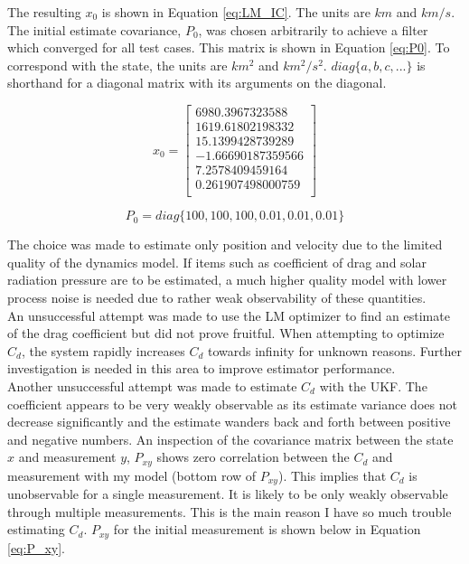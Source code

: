 \documentclass[11pt]{article}
\begin{document}
The resulting $x_0$ is shown in Equation \eqref{eq:LM_IC}. The units are $km$ and $km/s$. The initial estimate covariance, $P_0$, was chosen arbitrarily to achieve a filter which converged for all test cases. This matrix is shown in Equation \eqref{eq:P0}. To correspond with the state, the units are $km^2$ and $km^2/s^2$. $diag \{a, b, c, ... \}$ is shorthand for a diagonal matrix with its arguments on the diagonal.

\begin{equation}
	\label{eq:LM_IC}
	x_0 = \begin{bmatrix}
	6980.3967323588 \\
	1619.61802198332 \\
	15.1399428739289 \\
	-1.66690187359566 \\
	7.2578409459164 \\
	0.261907498000759 \\	
	\end{bmatrix}
\end{equation}

\begin{equation}
	\label{eq:P0}
	P_0 = diag \{ 100, 100, 100, 0.01, 0.01, 0.01 \}
\end{equation}

The choice was made to estimate only position and velocity due to the limited quality of the dynamics model. If items such as coefficient of drag and solar radiation pressure are to be estimated, a much higher quality model with lower process noise is needed due to rather weak observability of these quantities. \\

An unsuccessful attempt was made to use the LM optimizer to find an estimate of the drag coefficient but did not prove fruitful. When attempting to optimize $C_d$, the system rapidly increases $C_d$ towards infinity for unknown reasons. Further investigation is needed in this area to improve estimator performance. \\

Another unsuccessful attempt was made to estimate $C_d$ with the UKF. The coefficient appears to be very weakly observable as its estimate variance does not decrease significantly and the estimate wanders back and forth between positive and negative numbers. An inspection of the covariance matrix between the state $x$ and measurement $y$, $P_{xy}$ shows zero correlation between the $C_d$ and measurement with my model (bottom row of $P_{xy}$). This implies that $C_d$ is unobservable for a single measurement. It is likely to be only weakly observable through multiple measurements. This is the main reason I have so much trouble estimating $C_d$. $P_{xy}$ for the initial measurement is shown below in Equation \eqref{eq:P_xy}.
\end{document}
